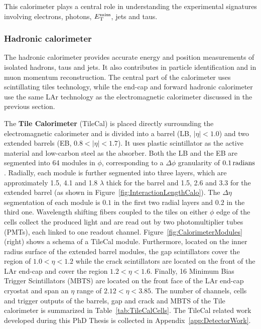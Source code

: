 This calorimeter plays a central role in understanding the experimental signatures involving electrons, photons, $E_{\mathrm{T}}^{\mathrm{miss}}$, jets and taus.


\subsubsection{Hadronic calorimeter}
    \label{subsubsec:TileCal}

The hadronic calorimeter provides accurate energy and position measurements of isolated hadrons, taus and jets.
It also contributes in particle identification and in muon momentum reconstruction.
The central part of the calorimeter uses scintillating tiles technology, while the end-cap and forward hadronic calorimeter use the same LAr technology as the electromagnetic calorimeter discussed in the previous section.

The {\bf Tile Calorimeter} (TileCal) is placed directly surrounding the electromagnetic calorimeter and is divided into a barrel (LB, $|\eta|<1.0$) and two extended barrels (EB, $0.8<|\eta|<1.7$).
It uses plastic scintillator as the active material and low-carbon steel as the absorber.
Both the LB and the EB are segmented into 64 modules in $\phi$, corresponding to a $\Delta\phi$ granularity of $\unit[0.1]{radians}$.
Radially, each module is further segmented into three layers, which are approximately 1.5, 4.1 and 1.8 $\lambda$ thick for the barrel and 1.5, 2.6 and 3.3 for the extended barrel (as shown in Figure~\ref{fig:InteractionLengthCalo}).
The $\Delta\eta$ segmentation of each module is $0.1$ in the first two radial layers and $0.2$ in the third one.
Wavelength shifting fibers coupled to the tiles on either $\phi$ edge of the cells collect the produced light and are read out by two photomultiplier tubes (PMTs), each linked to one readout channel. 
Figure~\ref{fig:CalorimeterModules} (right) shows a schema of a TileCal module.
Furthermore, located on the inner radius surface of the extended barrel modules, the gap scintillators cover the region of $1.0<\eta<1.2$ while the crack scintillators are located on the front of the LAr end-cap and cover the region $1.2<\eta<1.6$.
Finally, 16 Minimum Bias Trigger Scintillators (MBTS) are located on the front face of the LAr end-cap cryostat and span an $\eta$ range of $2.12<\eta<3.85$.
The number of channels, cells and trigger outputs of the barrels, gap and crack and MBTS of the Tile calorimeter is summarized in Table~\ref{tab:TileCalCells}.
The TileCal related work developed during this PhD Thesis is collected in Appendix~\ref{app:DetectorWork}.

